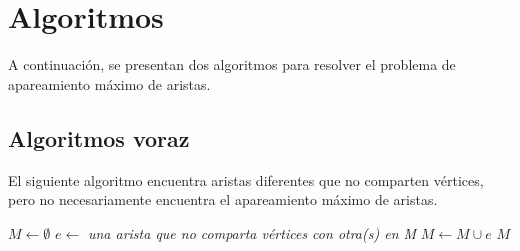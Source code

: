 \documentclass[12pt,a4paper]{article}
\begin{document}
\section{Algoritmos} \noindent 
A continuación, se presentan dos algoritmos para resolver el problema de apareamiento máximo de aristas.

\subsection{Algoritmos voraz}
El siguiente algoritmo encuentra aristas diferentes que no comparten vértices, pero no necesariamente encuentra el apareamiento máximo de aristas.

\begin{center}
	\begin{algorithmic}[1]
		\STATE $M\gets \emptyset$
			\STATE $e\gets$ \textit{una arista que no comparta vértices con otra(s) en M}
    		\STATE $M\gets M \cup e$
		\ENDWHILE
		\RETURN $M$
	\end{algorithmic}
\end{center}
\end{document}
